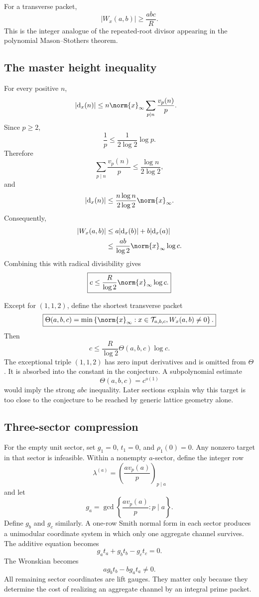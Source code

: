 For a transverse packet,
\[
 \boxed{
 |W_x(a,b)|\ge\frac{abc}{R}.
 }
\]
This is the integer analogue of the repeated-root divisor appearing in the polynomial Mason--Stothers theorem.

\subsection{The master height inequality}
For every positive $n$,
\[
 \begin{aligned}
 |\mathrm d_x(n)|
 &\le
 n\norm{x}_\infty
 \sum_{p\mid n}\frac{v_p(n)}p.
 \end{aligned}
\]
Since $p\ge2$,
\[
 \frac1p\le\frac1{2\log2}\log p.
\]
Therefore
\[
 \sum_{p\mid n}\frac{v_p(n)}p
 \le
 \frac{\log n}{2\log2},
\]
and
\[
 |\mathrm d_x(n)|
 \le
 \frac{n\log n}{2\log2}\norm{x}_\infty.
\]
Consequently,
\[
 \begin{aligned}
 |W_x(a,b)|
 &\le
 a|\mathrm d_x(b)|+b|\mathrm d_x(a)|\\
 &\le
 \frac{ab}{\log2}\norm{x}_\infty\log c.
 \end{aligned}
\]
Combining this with radical divisibility gives
\[
 \boxed{
 c
 \le
 \frac{R}{\log2}\norm{x}_\infty\log c.
 }
\]

Except for $(1,1,2)$, define the shortest transverse packet
\[
 \boxed{
 \Theta(a,b,c)
 =
 \min\left\{
 \norm{x}_\infty:
 x\in\mathcal T_{a,b,c},
 W_x(a,b)\neq0
 \right\}.
 }
\]
Then
\[
 c
 \le
 \frac{R}{\log2}\Theta(a,b,c)\log c.
\]
The exceptional triple $(1,1,2)$ has zero input derivatives and is omitted from $\Theta$. It is absorbed into the constant in the conjecture. A subpolynomial estimate
\[
 \Theta(a,b,c)=c^{o(1)}
\]
would imply the strong $abc$ inequality. Later sections explain why this target is too close to the conjecture to be reached by generic lattice geometry alone.

\subsection{Three-sector compression}
For the empty unit sector, set $g_1=0$, $t_1=0$, and $\rho_1(0)=0$. Any nonzero target in that sector is infeasible. Within a nonempty $a$-sector, define the integer row
\[
 \lambda^{(a)}
 =
 \left(\frac{a v_p(a)}p\right)_{p\mid a}
\]
and let
\[
 g_a=\gcd\left\{\frac{a v_p(a)}p:p\mid a\right\}.
\]
Define $g_b$ and $g_c$ similarly. A one-row Smith normal form in each sector produces a unimodular coordinate system in which only one aggregate channel survives. The additive equation becomes
\[
 \boxed{
 g_at_a+g_bt_b-g_ct_c=0.
 }
\]
The Wronskian becomes
\[
 \boxed{
 a g_bt_b-b g_at_a\neq0.
 }
\]
All remaining sector coordinates are lift gauges. They matter only because they determine the cost of realizing an aggregate channel by an integral prime packet.

